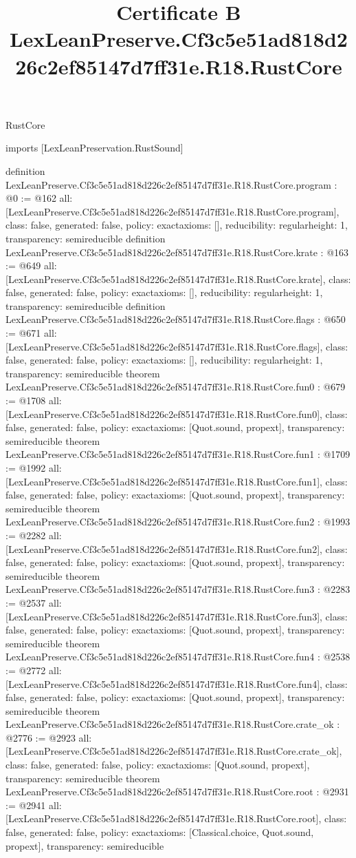 \begin{lexlean}{RustCore}
\title{Certificate B LexLeanPreserve.Cf3c5e51ad818d226c2ef85147d7ff31e.R18.RustCore}
\begin{coremodule}
imports [LexLeanPreservation.RustSound]

definition LexLeanPreserve.Cf3c5e51ad818d226c2ef85147d7ff31e.R18.RustCore.program : @0 := @162 {
  all: [LexLeanPreserve.Cf3c5e51ad818d226c2ef85147d7ff31e.R18.RustCore.program],
  class: false,
  generated: false,
  policy: exact{axioms: []},
  reducibility: regular{height: 1},
  transparency: semireducible
}
definition LexLeanPreserve.Cf3c5e51ad818d226c2ef85147d7ff31e.R18.RustCore.krate : @163 := @649 {
  all: [LexLeanPreserve.Cf3c5e51ad818d226c2ef85147d7ff31e.R18.RustCore.krate],
  class: false,
  generated: false,
  policy: exact{axioms: []},
  reducibility: regular{height: 1},
  transparency: semireducible
}
definition LexLeanPreserve.Cf3c5e51ad818d226c2ef85147d7ff31e.R18.RustCore.flags : @650 := @671 {
  all: [LexLeanPreserve.Cf3c5e51ad818d226c2ef85147d7ff31e.R18.RustCore.flags],
  class: false,
  generated: false,
  policy: exact{axioms: []},
  reducibility: regular{height: 1},
  transparency: semireducible
}
theorem LexLeanPreserve.Cf3c5e51ad818d226c2ef85147d7ff31e.R18.RustCore.fun0 : @679 := @1708 {
  all: [LexLeanPreserve.Cf3c5e51ad818d226c2ef85147d7ff31e.R18.RustCore.fun0],
  class: false,
  generated: false,
  policy: exact{axioms: [Quot.sound, propext]},
  transparency: semireducible
}
theorem LexLeanPreserve.Cf3c5e51ad818d226c2ef85147d7ff31e.R18.RustCore.fun1 : @1709 := @1992 {
  all: [LexLeanPreserve.Cf3c5e51ad818d226c2ef85147d7ff31e.R18.RustCore.fun1],
  class: false,
  generated: false,
  policy: exact{axioms: [Quot.sound, propext]},
  transparency: semireducible
}
theorem LexLeanPreserve.Cf3c5e51ad818d226c2ef85147d7ff31e.R18.RustCore.fun2 : @1993 := @2282 {
  all: [LexLeanPreserve.Cf3c5e51ad818d226c2ef85147d7ff31e.R18.RustCore.fun2],
  class: false,
  generated: false,
  policy: exact{axioms: [Quot.sound, propext]},
  transparency: semireducible
}
theorem LexLeanPreserve.Cf3c5e51ad818d226c2ef85147d7ff31e.R18.RustCore.fun3 : @2283 := @2537 {
  all: [LexLeanPreserve.Cf3c5e51ad818d226c2ef85147d7ff31e.R18.RustCore.fun3],
  class: false,
  generated: false,
  policy: exact{axioms: [Quot.sound, propext]},
  transparency: semireducible
}
theorem LexLeanPreserve.Cf3c5e51ad818d226c2ef85147d7ff31e.R18.RustCore.fun4 : @2538 := @2772 {
  all: [LexLeanPreserve.Cf3c5e51ad818d226c2ef85147d7ff31e.R18.RustCore.fun4],
  class: false,
  generated: false,
  policy: exact{axioms: [Quot.sound, propext]},
  transparency: semireducible
}
theorem LexLeanPreserve.Cf3c5e51ad818d226c2ef85147d7ff31e.R18.RustCore.crate_ok : @2776 := @2923 {
  all: [LexLeanPreserve.Cf3c5e51ad818d226c2ef85147d7ff31e.R18.RustCore.crate_ok],
  class: false,
  generated: false,
  policy: exact{axioms: [Quot.sound, propext]},
  transparency: semireducible
}
theorem LexLeanPreserve.Cf3c5e51ad818d226c2ef85147d7ff31e.R18.RustCore.root : @2931 := @2941 {
  all: [LexLeanPreserve.Cf3c5e51ad818d226c2ef85147d7ff31e.R18.RustCore.root],
  class: false,
  generated: false,
  policy: exact{axioms: [Classical.choice, Quot.sound, propext]},
  transparency: semireducible
}


\end{coremodule}
\end{lexlean}
